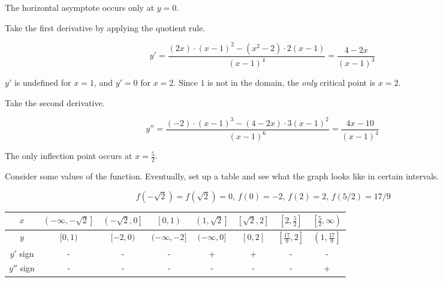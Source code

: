 \documentclass{article}
\begin{document}
\hfill

\noindent The horizontal asymptote occurs only at $y=0$.

\hfill

\noindent Take the first derivative by applying the quotient rule.

\begin{equation*}y' = \frac{(2x)\cdot (x-1)^2 - (x^2-2)\cdot 2(x-1)}{(x-1)^4}=\frac{4-2x}{(x-1)^3}\end{equation*}

\hfill

\noindent $y'$ is undefined for $x=1$, and $y'=0$ for $x=2$. Since $1$ is not in the domain, the \textit{only} critical point is $x = 2$.

\hfill

\noindent Take the second derivative.

\begin{equation*}y'' = \frac{(-2)\cdot(x-1)^3-(4-2x)\cdot3(x-1)^2 }{(x-1)^6}=\frac{4x-10}{(x-1)^4}\end{equation*}

\hfill

\noindent The only inflection point occurs at $\displaystyle x=\frac52$.

\hfill

\noindent Consider some values of the function. Eventually, set up a table and see what the graph looks like in certain intervals.

\begin{equation*}\,f\left(-\sqrt2\right)=f\left(\sqrt2\right)=0,\,f(0)=-2,\,f(2)=2,\,f(5/2)=17/9\end{equation*}

\begin{center}
    \large
    \begin{tabular}{ |c| c c c c c c c| } 
    \hline
        $x$ & $\left(-\infty, -\sqrt2\right]$ & $\left(-\sqrt2, 0\right]$&$\left[0, 1\right)$ & $\left(1,\sqrt2\right]$ & $\left[\sqrt2, 2\right]$ & $\left[2, \frac52\right]$ & $\left[\frac52, \infty\right)$  \\
        \hline
        $y$ & $[0, 1)$ &$[-2,0)$ & $(-\infty, -2]$& $(-\infty, 0]$& $[0, 2]$& $\left[\frac{17}9, 2\right]$& $\left(1, \frac{17}9\right]$\\
        \hline
        $y'$ sign & - & - & - &+&+&-&- \\
        \hline
        $y''$ sign & - &- &-&-&-&-&+ \\
        \hline
    \end{tabular}
\end{center}
\end{document}
